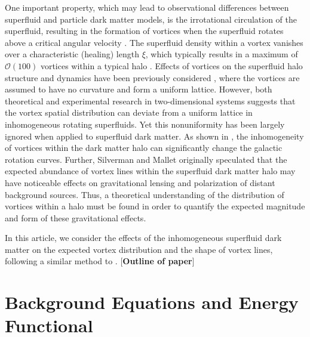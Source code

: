 \documentclass[aps,prd,twocolumn,nofootinbib,superscriptaddress]{revtex4-1}
\begin{document}
One important property, which may lead to observational differences between superfluid and particle dark matter models, is the irrotational circulation of the superfluid, resulting in the formation of vortices when the superfluid rotates above a critical angular velocity \cite{Fetter}.  The superfluid density within a vortex vanishes over a characteristic (healing) length $\xi$, which typically results in a maximum of $\mathcal{O}(100)$ vortices within a typical halo \cite{Silverman:2002qx,Yu:2002,Kain:2010rb,RindlerDaller:2011kx}.  Effects of vortices on the superfluid halo structure and dynamics have been previously considered \cite{Kain:2010rb,RindlerDaller:2011kx,Zinner:2011if,RindlerDaller:2012vj,Banik:2013rxa}, where the vortices are assumed to have no curvature and form a uniform lattice.  However, both theoretical \cite{Sheehy:2004a,Sheehy:2004b,Watanabe:2004,Cooper:2004} and experimental \cite{Yarmchuk:1979,Campbell:1979,Coddington:2004} research in two-dimensional systems suggests that the vortex spatial distribution can deviate from a uniform lattice in inhomogeneous rotating superfluids.  Yet this nonuniformity has been largely ignored when applied to superfluid dark matter.  As shown in \cite{Yu:2002,Zinner:2011if}, the inhomogeneity of vortices within the dark matter halo can significantly change the galactic rotation curves.  Further, Silverman and Mallet \cite{Silverman:2002qx} originally speculated that the expected abundance of vortex lines within the superfluid dark matter halo may have noticeable effects on gravitational lensing and polarization of distant background sources.  Thus, a theoretical understanding of the distribution of vortices within a halo must be found in order to quantify the expected magnitude and form of these gravitational effects.

In this article, we consider the effects of the inhomogeneous superfluid dark matter on the expected vortex distribution and the shape of vortex lines, following a similar method to \cite{Sheehy:2004a,Sheehy:2004b}. [{\bf Outline of paper}]




\section{Background Equations and Energy Functional}
\label{Sec:Background}
\end{document}

